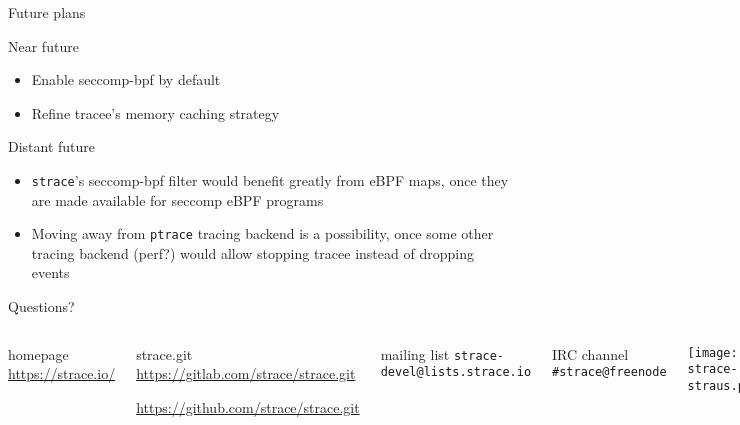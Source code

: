\documentclass[unicode]{beamer}
\begin{document}
\begin{frame}[fragile]{Future plans}
\begin{block}{Near future}
\begin{itemize}
  \item Enable seccomp-bpf by default
  \item Refine tracee's memory caching strategy
\end{itemize}
\end{block}
\begin{block}{Distant future}
\begin{itemize}
  \item \texttt{strace}'s seccomp-bpf filter would benefit greatly from eBPF
        maps, once they are made available for seccomp eBPF programs
  \item Moving away from \texttt{ptrace} tracing backend is a possibility, once
        some other tracing backend (perf?) would allow stopping tracee instead
	of dropping events\footnotemark[1]\footnotemark[2]
\end{itemize}
\end{block}
\end{frame}

{
\begin{frame}{Questions?}
	\begin{columns}
		\column{7.5cm}
\begin{block}{\large homepage}
	\url{https://strace.io/}
\end{block}
\begin{block}{\large strace.git}
	\url{https://gitlab.com/strace/strace.git}

	\url{https://github.com/strace/strace.git}
\end{block}
\begin{block}{\large mailing list}
	\texttt{strace-devel@lists.strace.io}
\end{block}
\begin{block}{\large IRC channel}
	\texttt{\#strace@freenode}
\end{block}
		\column{2.8cm}
			\centerline{\texttt{[image: strace-straus.pdf]}}
	\end{columns}
\end{frame}
}
\end{document}
